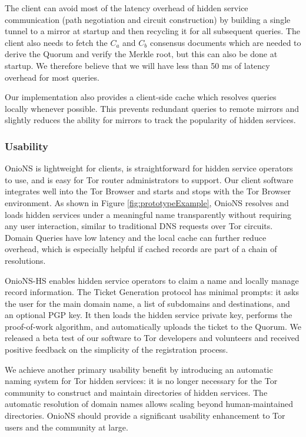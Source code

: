 \documentclass[USenglish,oneside,twocolumn]{article}
\begin{document}
The client can avoid most of the latency overhead of hidden service communication (path negotiation and circuit construction) by building a single tunnel to a mirror at startup and then recycling it for all subsequent queries. The client also needs to fetch the $ C_{a} $ and $ C_{b} $ consensus documents which are needed to derive the Quorum and verify the Merkle root, but this can also be done at startup. We therefore believe that we will have less than 50 ms of latency overhead for most queries.

Our implementation also provides a client-side cache which resolves queries locally whenever possible. This prevents redundant queries to remote mirrors and slightly reduces the ability for mirrors to track the popularity of hidden services.

\subsubsection{Usability}

OnioNS is lightweight for clients, is straightforward for hidden service operators to use, and is easy for Tor router administrators to support. Our client software integrates well into the Tor Browser and starts and stops with the Tor Browser environment. As shown in Figure \ref{fig:prototypeExample}, OnioNS resolves and loads hidden services under a meaningful name transparently without requiring any user interaction, similar to traditional DNS requests over Tor circuits. Domain Queries have low latency and the local cache can further reduce overhead, which is especially helpful if cached records are part of a chain of resolutions. 

OnioNS-HS enables hidden service operators to claim a name and locally manage record information. The Ticket Generation protocol has minimal prompts: it asks the user for the main domain name, a list of subdomains and destinations, and an optional PGP key. It then loads the hidden service private key, performs the proof-of-work algorithm, and automatically uploads the ticket to the Quorum. We released a beta test of our software to Tor developers and volunteers and received positive feedback on the simplicity of the registration process.

We achieve another primary usability benefit by introducing an automatic naming system for Tor hidden services: it is no longer necessary for the Tor community to construct and maintain directories of hidden services. The automatic resolution of domain names allows scaling beyond human-maintained directories. OnioNS should provide a significant usability enhancement to Tor users and the community at large.
\end{document}

